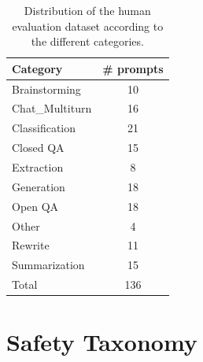 \documentclass[11pt]{article}
\begin{document}
\begin{table}[ht]
\centering
\begin{tabular}{lc}
\toprule
Category        & \# prompts  \\ 
\midrule
Brainstorming   & 10          \\
Chat\_Multiturn & 16          \\
Classification  & 21          \\
Closed QA       & 15          \\
Extraction      & 8           \\
Generation      & 18          \\
Open QA         & 18          \\
Other           & 4           \\
Rewrite         & 11          \\
Summarization   & 15          \\ 
\midrule
Total           & 136        \\
\bottomrule
\end{tabular}
\caption{Distribution of the human evaluation dataset according to the different categories.}
\end{table}

\section{Safety Taxonomy}
\label{sup:safety-taxonomy}
\end{document}
